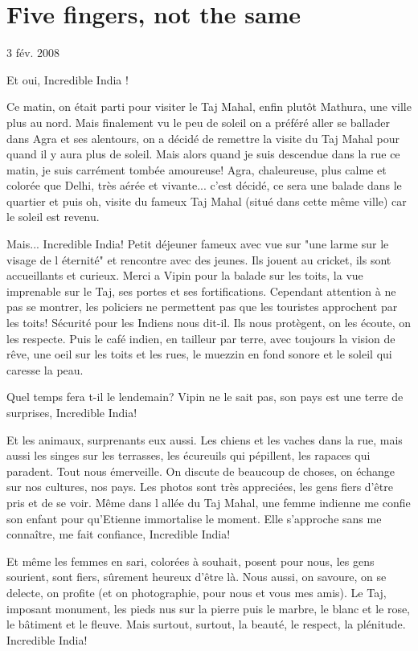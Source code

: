 \section{Five fingers, not the same}

3 fév. 2008

\begin{multicols}{2}

Et oui, Incredible India !

Ce matin, on était parti pour visiter le Taj Mahal, enfin plutôt Mathura, une ville plus au nord. Mais finalement vu le peu de soleil on a préféré aller se ballader dans Agra et ses alentours, on a décidé de remettre la visite du Taj Mahal pour quand il y aura plus de soleil. Mais alors quand je suis descendue dans la rue ce matin, je suis carrément tombée amoureuse! Agra, chaleureuse, plus calme et colorée que Delhi, très aérée et vivante... c'est décidé, ce sera une balade dans le quartier et puis oh, visite du fameux Taj Mahal (situé dans cette même ville) car le soleil est revenu.

Mais... Incredible India! Petit déjeuner fameux avec vue sur "une larme sur le visage de l éternité" et rencontre avec des jeunes. Ils jouent au cricket, ils sont accueillants et curieux. Merci a Vipin pour la balade sur les toits, la vue imprenable sur le Taj, ses portes et ses fortifications. Cependant attention à ne pas se montrer, les policiers ne permettent pas que les touristes approchent par les toits! Sécurité pour les Indiens nous dit-il. Ils nous protègent, on les écoute, on les respecte. Puis le café indien, en tailleur par terre, avec toujours la vision de rêve, une oeil sur les toits et les rues, le muezzin en fond sonore et le soleil qui caresse la peau.

Quel temps fera t-il le lendemain? Vipin ne le sait pas, son pays est une terre de surprises, Incredible India!

Et les animaux, surprenants eux aussi. Les chiens et les vaches dans la rue, mais aussi les singes sur les terrasses, les écureuils qui pépillent, les rapaces qui paradent. Tout nous émerveille. On discute de beaucoup de choses, on échange sur nos cultures, nos pays. Les photos sont très appreciées, les gens fiers d'être pris et de se voir. Même dans l allée du Taj Mahal, une femme indienne me confie son enfant pour qu'Etienne immortalise le moment. Elle s'approche sans me connaître, me fait confiance, Incredible India!

Et même les femmes en sari, colorées à souhait, posent pour nous, les gens sourient, sont fiers, sûrement heureux d'être là. Nous aussi, on savoure, on se delecte, on profite (et on photographie, pour nous et vous mes amis). Le Taj, imposant monument, les pieds nus sur la pierre puis le marbre, le blanc et le rose, le bâtiment et le fleuve. Mais surtout, surtout, la beauté, le respect, la plénitude. Incredible India!


\end{multicols}
